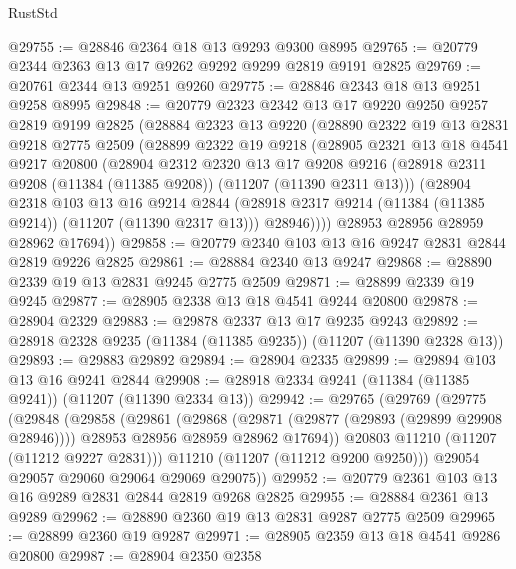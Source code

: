 \begin{lexlean}{RustStd}
\begin{coremodule}
@29755 := @28846 @2364 @18 @13 @9293 @9300 @8995
@29765 := @20779 @2344 @2363 @13 @17 @9262 @9292 @9299 @2819 @9191 @2825
@29769 := @20761 @2344 @13 @9251 @9260
@29775 := @28846 @2343 @18 @13 @9251 @9258 @8995
@29848 := @20779
    @2323
    @2342
    @13
    @17
    @9220
    @9250
    @9257
    @2819
    @9199
    @2825
    (@28884
      @2323
      @13
      @9220
      (@28890
        @2322
        @19
        @13
        @2831
        @9218
        @2775
        @2509
        (@28899
          @2322
          @19
          @9218
          (@28905
            @2321
            @13
            @18
            @4541
            @9217
            @20800
            (@28904
              @2312
              @2320
              @13
              @17
              @9208
              @9216
              (@28918 @2311 @9208 (@11384 (@11385 @9208)) (@11207 (@11390 @2311 @13)))
              (@28904
                @2318
                @103
                @13
                @16
                @9214
                @2844
                (@28918 @2317 @9214 (@11384 (@11385 @9214)) (@11207 (@11390 @2317 @13)))
                @28946))))
        @28953
        @28956
        @28959
        @28962
        @17694))
@29858 := @20779 @2340 @103 @13 @16 @9247 @2831 @2844 @2819 @9226 @2825
@29861 := @28884 @2340 @13 @9247
@29868 := @28890 @2339 @19 @13 @2831 @9245 @2775 @2509
@29871 := @28899 @2339 @19 @9245
@29877 := @28905 @2338 @13 @18 @4541 @9244 @20800
@29878 := @28904 @2329
@29883 := @29878 @2337 @13 @17 @9235 @9243
@29892 := @28918 @2328 @9235 (@11384 (@11385 @9235)) (@11207 (@11390 @2328 @13))
@29893 := @29883 @29892
@29894 := @28904 @2335
@29899 := @29894 @103 @13 @16 @9241 @2844
@29908 := @28918 @2334 @9241 (@11384 (@11385 @9241)) (@11207 (@11390 @2334 @13))
@29942 := @29765
    (@29769
      (@29775
        (@29848
          (@29858
            (@29861
              (@29868
                (@29871 (@29877 (@29893 (@29899 @29908 @28946))))
                @28953
                @28956
                @28959
                @28962
                @17694))
            @20803
            @11210
            (@11207 (@11212 @9227 @2831)))
          @11210
          (@11207 (@11212 @9200 @9250)))
        @29054
        @29057
        @29060
        @29064
        @29069
        @29075))
@29952 := @20779 @2361 @103 @13 @16 @9289 @2831 @2844 @2819 @9268 @2825
@29955 := @28884 @2361 @13 @9289
@29962 := @28890 @2360 @19 @13 @2831 @9287 @2775 @2509
@29965 := @28899 @2360 @19 @9287
@29971 := @28905 @2359 @13 @18 @4541 @9286 @20800
@29987 := @28904
    @2350
    @2358

\end{coremodule}
\end{lexlean}
